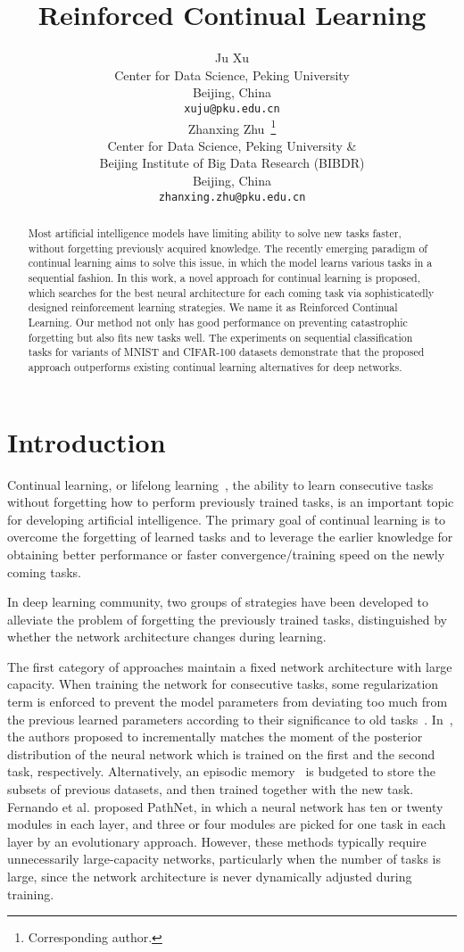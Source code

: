 \documentclass{article}
\title{Reinforced Continual Learning}
\author{
  Ju Xu  \\
  Center for Data Science, Peking University\\
  Beijing, China \\
  \texttt{xuju@pku.edu.cn} \\
  \And
   Zhanxing Zhu~\thanks{Corresponding author.}\\
   Center for Data Science, Peking University \& \\
   Beijing Institute of Big Data Research (BIBDR) \\
  Beijing, China \\
  \texttt{zhanxing.zhu@pku.edu.cn} \\
}
\begin{document}
\maketitle
\renewcommand\arraystretch{2}

\begin{abstract}
  Most artificial intelligence models   have  limiting ability to solve new tasks
  faster, without forgetting previously acquired knowledge. The recently emerging paradigm of continual learning aims to solve this issue, in which the model
  learns various tasks in a sequential fashion.
  In this work, a novel approach for continual learning is proposed,  which  searches for the best neural architecture for each coming task via sophisticatedly designed reinforcement learning strategies.  We name it as Reinforced Continual Learning. Our method not only has good performance on preventing catastrophic forgetting but also fits new tasks well.
  The experiments on sequential classification tasks for variants of MNIST and CIFAR-100 datasets demonstrate that the proposed approach outperforms existing continual learning alternatives for deep networks.
\end{abstract}

\section{Introduction}

Continual learning, or lifelong learning~\cite{thrun1}, the ability to learn
consecutive tasks without forgetting how to perform previously
trained tasks, is
an important topic for developing artificial intelligence. The primary goal of continual learning is to overcome the forgetting of learned tasks and to leverage  the earlier knowledge for obtaining better performance or faster convergence/training speed on the newly coming tasks.


In  deep learning community, two groups of strategies have been developed to alleviate the problem of  forgetting the previously trained tasks, distinguished by whether the network architecture changes during learning.

The first category of approaches maintain a fixed network architecture with large capacity.  When training the network for consecutive tasks, some regularization term is enforced to prevent the model parameters from deviating too much
from the previous learned parameters according to their significance to old tasks~\cite{kirkpatrick1,zenke1}. In~\cite{lee2017overcoming}, the authors proposed to incrementally matches the moment of the posterior distribution of the neural network which is trained on the first and the second task, respectively. Alternatively, an episodic memory~\cite{GradientEpisodicMemory} is budgeted to store the subsets of previous datasets, and then trained together with the new task.
Fernando et al. \cite{fernando1} proposed PathNet, in which a neural network has ten or twenty modules in each layer, and three or four modules are picked for one task in each layer by an evolutionary approach.  However, these methods typically require unnecessarily large-capacity networks, particularly when the number of tasks is  large, since the network architecture is never dynamically adjusted during training.
\end{document}
